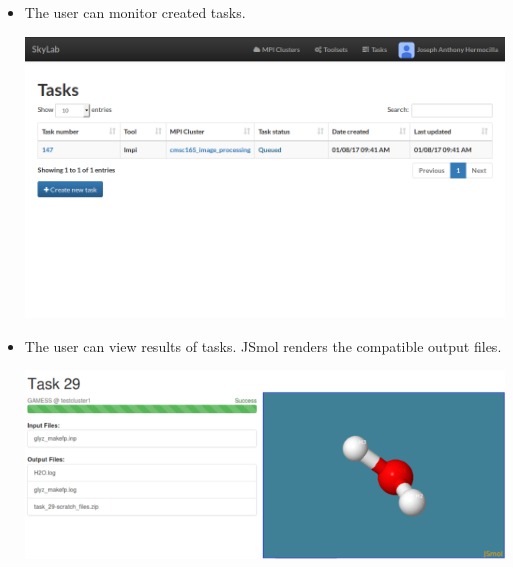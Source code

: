 \begin{itemize}
		\item The user can monitor created tasks. \newline
		\begin{center}			
			\includegraphics[scale=0.93]{./images/n_tasks_printed.png}			
		\end{center}	
		\item The user can view results of tasks. JSmol renders the compatible output files\cite{IJCH:IJCH201300024}. \newline
		\begin{center}			
			\includegraphics[scale=0.35]{./images/jsmol_detail_view_2.png}			
		\end{center}	

		    
		
	\end{itemize}
	
